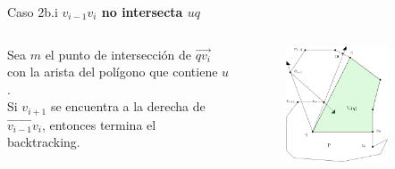 \documentclass[aspectratio=169,xcolor=dvipsnames, t]{beamer}
\begin{document}

\begin{frame}{Caso 2b.i}
    \textbf{$v_{i-1}v_{i}$ no intersecta $uq$}\\
    \vspace{0.5cm}
    \begin{columns}
    \begin{column}{0.45\textwidth}
        Sea $m$ el punto de intersección de $\overrightarrow{qv_{i}}$ con la arista del polígono que contiene $u$.\\
        \vspace{0.5cm}
        Si $v_{i+1}$ se encuentra a la derecha de $\overrightarrow{v_{i-1}v_{i}}$, entonces termina el backtracking.
    \end{column}
    \begin{column}{0.45\textwidth}  %
    \vspace{-2.5cm}
        \begin{figure}
            \centering
            \includegraphics[width=0.75\textwidth]{imagenes/Caso2.6a.png}
        \end{figure}
    \end{column}
    \end{columns}
\end{frame}

\end{document}
